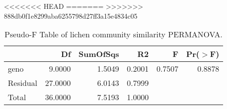 <<<<<<< HEAD
=======
>>>>>>> 888db0f1e8299aba6255798d27ff3a15e4834c05
\begin{table}[ht]
\centering
\begin{tabular}{lrrrrr}
  \hline
 & Df & SumOfSqs & R2 & F & Pr($>$F) \\ 
  \hline
geno & 9.0000 & 1.5049 & 0.2001 & 0.7507 & 0.8878 \\ 
  Residual & 27.0000 & 6.0143 & 0.7999 &  &  \\ 
  Total & 36.0000 & 7.5193 & 1.0000 &  &  \\ 
   \hline
\end{tabular}
\caption{Pseudo-F Table of lichen community similarity PERMANOVA.} 
\label{tab:com_perm}
\end{table}
